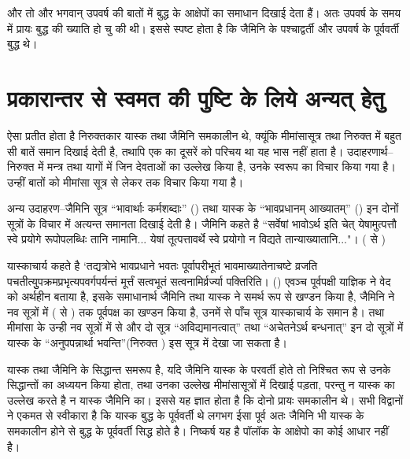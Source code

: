 और तो और भगवान् उपवर्ष की बातों में बुद्ध के आक्षेपों का समाधान दिखाई देता हैं। अतः उपवर्ष के समय में प्रायः बुद्ध की ख्याति हो चु की थी। इससे स्पष्ट होता है कि जैमिनि के पश्चाद्वर्ती और उपवर्ष के पूर्ववर्ती बुद्ध थे।


\section*{प्रकारान्तर से स्वमत की पुष्टि के लिये अन्यत् हेतु}

ऐसा प्रतीत होता है निरुक्तकार यास्क तथा जैमिनि समकालीन थे, क्यूंकि मीमांसासूत्र तथा निरुक्त में बहुत सी बातें समान दिखाई देती है, तथापि एक का दूसरें को परिचय था यह भास नहीं हाता है। उदाहरणार्थ–निरुक्त  में मन्त्र तथा यागों में जिन देवताओं का उल्लेख किया है, उनके स्वरूप का विचार किया गया है। उन्हीं बातों को मीमांसा सूत्र  से लेकर  तक विचार किया गया है। 

अन्य उदाहरण–जैमिनि सूत्र “भावार्थाः कर्मशब्दाः” () तथा यास्क के “भावप्रधानम् आख्यातम्” () इन दोनों सूत्रों के विचार में अत्यन्त समानता दिखाई देती है। जैमिनि कहते है “सर्वेषां भावोऽर्थ इति चेत् येषामुत्पत्तौ स्वे प्रयोगे रूपोपलब्धिः तानि नामानि... येषां तूत्पत्तावर्थे स्वे प्रयोगो न विद्यते तान्याख्यातानि..."। ( से )

यास्काचार्य कहते है ‘तद्यत्रोभे भावप्रधाने भवतः पूर्वापरीभूतं भावमाख्यातेनाचष्टे व्रजति पचतीत्युुपक्रमप्रभृत्यपवर्गपर्यन्तं मूर्त्तं सत्वभूतं सत्वनामिर्व्रर्ज्या पक्तिरिति। () एवञ्च पूर्वपक्षी याज्ञिक ने वेद को अर्थहीन बताया है, इसके समाधानार्थ जैमिनि तथा यास्क ने समर्थ रूप से खण्डन किया है, जैमिनि ने नव सूत्रों में ( से ) तक पूर्वपक्ष का खण्डन किया है, उनमें से पाँच सूत्र यास्काचार्य के समान है। तथा मीमांसा के उन्ही नव सूत्रों में से और दो सूत्र “अविद्यमानत्वात्” तथा “अचेतनेऽर्थ बन्धनात्” इन दो सूत्रों में यास्क के “अनुपपन्नार्था भवन्ति”(निरुक्त ) इस सूत्र में देखा जा सकता है।

यास्क तथा जैमिनि के सिद्धान्त समरूप है, यदि जैमिनि यास्क के परवर्ती होते तो निश्चित रूप से उनके सिद्धान्तों का अध्ययन किया होता, तथा उनका उल्लेख मीमांसासूत्रों में दिखाई पड़ता, परन्तु न यास्क का उल्लेख करते है न यास्क जैमिनि का। इससे यह ज्ञात होता है कि दोनो प्रायः समकालीन थे। सभी विद्वानों ने एकमत से स्वीकारा है कि यास्क बुद्ध के पूर्ववर्ती थे लगभग  ईसा पूर्व अतः जैमिनि भी यास्क के समकालीन होने से बुद्ध के पूर्ववर्ती सिद्ध होते है। निष्कर्ष यह है पॉलॉक के आक्षेपो का कोई आधार नहीं है।


